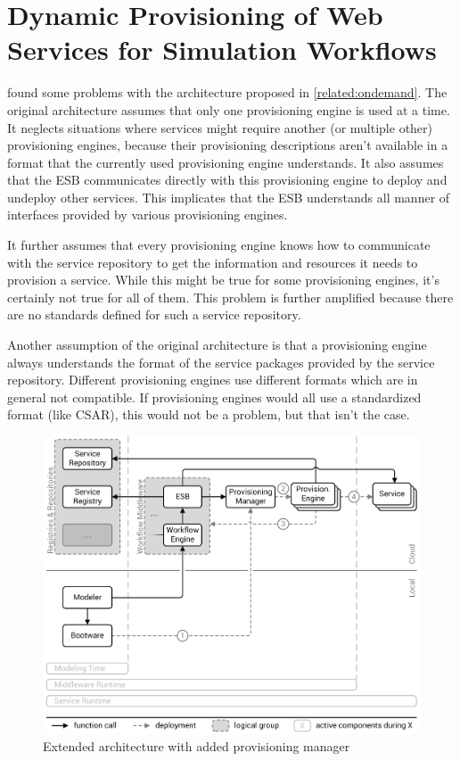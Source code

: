 \section{Dynamic Provisioning of Web Services for Simulation Workflows}
\label{related:dynamic}

\citeauthor{provisioning:dynamic} found some problems with the architecture proposed in \autoref{related:ondemand}.
The original architecture assumes that only one provisioning engine is used at a time.
It neglects situations where services might require another (or multiple other) provisioning engines, because their provisioning descriptions aren't available in a format that the currently used provisioning engine understands.
It also assumes that the ESB communicates directly with this provisioning engine to deploy and undeploy other services.
This implicates that the ESB understands all manner of interfaces provided by various provisioning engines.

It further assumes that every provisioning engine knows how to communicate with the service repository to get the information and resources it needs to provision a service.
While this might be true for some provisioning engines, it's certainly not true for all of them.
This problem is further amplified because there are no standards defined for such a service repository.

Another assumption of the original architecture is that a provisioning engine always understands the format of the service packages provided by the service repository.
Different provisioning engines use different formats which are in general not compatible.
If provisioning engines would all use a standardized format (like CSAR), this would not be a problem, but that isn't the case.

\begin{figure}[!htbp]
	\centering
	\includegraphics[resolution=600]{related/assets/valeri_architecture}
	\caption{Extended architecture with added provisioning manager~\autocite[based on][]{provisioning:dynamic}}
	\label{image:valeri_architecture}
\end{figure}

